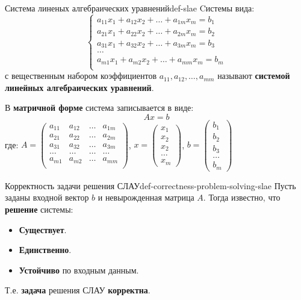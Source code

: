 \documentclass[14pt]{extarticle}
\begin{document}
    \begin{definition}{Система линеных алгебраических уравнений}{def-slae}
        Cистемы вида:
        $$
        \begin{cases} 
            a_{11}x_{1} + a_{12}x_{2} + \ldots + a_{1m}x_m = b_{1} \\
            a_{21}x_{1} + a_{22}x_{2} + \ldots + a_{2m}x_m = b_{2} \\
            a_{31}x_{1} + a_{32}x_{2} + \ldots + a_{3m}x_m = b_{3} \\
            \ldots \\
            a_{m1}x_{1} + a_{m2}x_{2} + \ldots + a_{mm}x_m = b_{m} \\
        \end{cases}
        $$
        с вещественным набором коэффициентов $a_{11}, a_{12}, \ldots, a_{mm}$ называют \textbf{системой линейных алгебраических уравнений}.

        \vspace{\baselineskip}

        В \textbf{матричной форме} система записывается в виде:
        $$Ax = b$$
        где: $A=
        \begin{pmatrix} 
            a_{11} & a_{12} & \ldots & a_{1m} \\ 
            a_{21} & a_{22} & \ldots & a_{2m} \\ 
            a_{31} & a_{32} & \ldots & a_{3m} \\ 
            \ldots & \ldots & \ldots & \ldots \\
            a_{m1} & a_{m2} & \ldots & a_{mm} \\ 
        \end{pmatrix}$, 
        $x = \begin{pmatrix} x_{1} \\ x_{2} \\ x_{2} \\ \ldots \\ x_{m}\end{pmatrix}$,
        $b = \begin{pmatrix} b_{1} \\ b_{2} \\ b_{3} \\ \ldots \\ b_{m}\end{pmatrix}$
    \end{definition}

    \begin{definition}{Корректность задачи решения СЛАУ}{def-correctness-problem-solving-slae}
        Пусть заданы входной вектор $b$ и невырожденная матрица $A$. Тогда известно, что \textbf{решение} системы: 
        \begin{itemize}
            \item \textbf{Существует}.
            \item \textbf{Единственно}.
            \item \textbf{Устойчиво} по входным данным.
        \end{itemize}
        Т.е. \textbf{задача} решения СЛАУ \textbf{корректна}.
    \end{definition}
\end{document}
